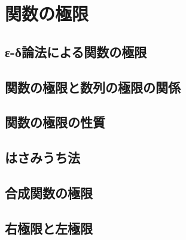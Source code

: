 \documentclass[../../math-imaging]{subfiles}
\begin{document}
\section{関数の極限}

\subsection{ε-δ論法による関数の極限}


\subsection{関数の極限と数列の極限の関係}


\subsection{関数の極限の性質}



\subsection{はさみうち法}


\subsection{合成関数の極限}


\subsection{右極限と左極限}



\end{document}
